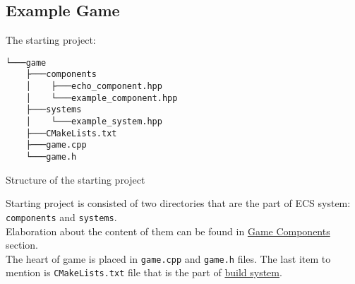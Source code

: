 \newpage

\subsection{Example Game}
The starting project:
\begin{verbatim}
└───game
    ├───components
    │    ├───echo_component.hpp
    │    └───example_component.hpp
    ├───systems
    │    └───example_system.hpp
    ├───CMakeLists.txt
    ├───game.cpp
    └───game.h
\end{verbatim}
\begin{table}[h]
\caption{Structure of the starting project}
\end{table}
Starting project is consisted of two directories that are the part of ECS system: \texttt{components} and \texttt{systems}.\\Elaboration about the content of them can be found in \hyperref[sec:game_components]{Game Components} section.\\ The heart of game is placed in \texttt{game.cpp} and \texttt{game.h} files. The last item to mention is \texttt{CMakeLists.txt} file that is the part of \hyperref[sec:build]{build system}.

